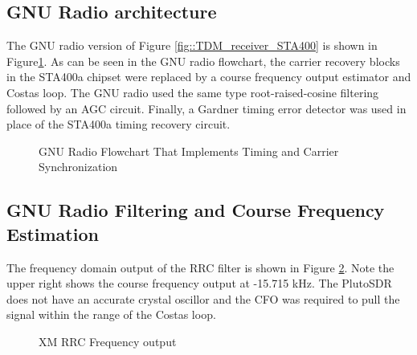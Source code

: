 \documentclass[conference,onecolumn]{IEEEtran}
\begin{document}
\subsection{GNU Radio architecture}

The GNU radio version of Figure \ref{fig::TDM_receiver_STA400} is shown in Figure\ref{fig::timing_carrier_sync2}.  As can be seen in the GNU radio flowchart, the carrier recovery blocks in the STA400a chipset were replaced by a course frequency output estimator and Costas loop.  The GNU radio used the same type root-raised-cosine filtering followed by an AGC circuit.  Finally, a Gardner timing error detector was used in place of the STA400a timing recovery circuit.


\begin{figure}[H]
	\centerline{}
	\caption{GNU Radio Flowchart That Implements Timing and Carrier Synchronization}
	\label{fig::timing_carrier_sync2}
\end{figure}
\subsection{GNU Radio Filtering and Course Frequency Estimation}

The frequency domain output of the RRC filter is shown in Figure \ref{fig::rrc_output}.  Note the upper right shows the course frequency output at -15.715 kHz.  The PlutoSDR does not have an accurate crystal oscillor and the CFO was required to pull the signal within the range of the Costas loop.
\begin{figure}[H]
	\centerline{}
	\caption{XM RRC Frequency output}
	\label{fig::rrc_output}
\end{figure}
\end{document}
